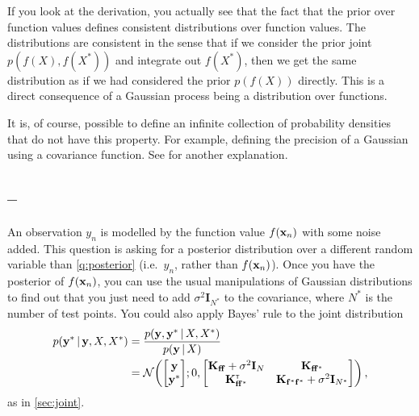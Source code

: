 \documentclass[a4paper]{article}
\newcommand{\K}{\mathbf{K}}
\newcommand{\questionref}[1]{\Cref{#1} -- \nameref{#1}}
\theoremstyle{definition}
\begin{document}
If you look at the derivation, you actually see that the fact that the prior over function values defines consistent distributions over function values. The distributions are consistent in the sense that if we consider the prior joint $p(f(X), f(X^*))$ and integrate out $f(X^*)$, then we get the same distribution as if we had considered the prior $p(f(X))$ directly. This is a direct consequence of a Gaussian process being a distribution over functions.

It is, of course, possible to define an infinite collection of probability densities that do not have this property. For example, defining the precision of a Gaussian using a covariance function. See \citet[\S 2.2]{gpml} for another explanation.




\subsection{\questionref{q:pred-obs}}
An observation $y_n$ is modelled by the function value $f(\mathbf{x}_n)$ with some noise added. This question is asking for a posterior distribution over a different random variable than \cref{q:posterior} (i.e.~$y_n$, rather than $f(\mathbf{x}_n)$). Once you have the posterior of $f(\mathbf{x}_n)$, you can use the usual manipulations of Gaussian distributions to find out that you just need to add $\sigma^2 \mathbf{I}_{N^*}$ to the covariance, where $N^*$ is the number of test points. You could also apply Bayes' rule to the joint distribution
\begin{align}
p(\vy^*\given \vy, X, X^*) &= \frac{p(\vy, \vy^*\given X, X^*)}{p(\vy\given X)} \\
&= \NormDist{\begin{bmatrix}\vy \\ \vy^*\end{bmatrix}; 0, \begin{bmatrix}\Kff + \sigma^2\mathbf{I}_N & \K_{\vf\vf^*} \\ \K_{\vf\vf^*}\transpose & \K_{\vf^*\vf^*} + \sigma^2 \mathbf{I}_{N^*}\end{bmatrix}} \,,
\end{align}
as in \cref{sec:joint}.
\end{document}
